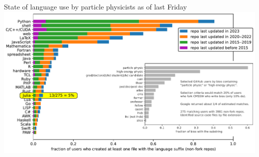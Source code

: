 \documentclass[aspectratio=169]{beamer}
\begin{document}
\begin{frame}{State of language use by particle physicists as of last Friday}
\vspace{0.2 cm}
\includegraphics[width=\linewidth]{physicist-languages-presentation.pdf}
\end{frame}






\end{document}
